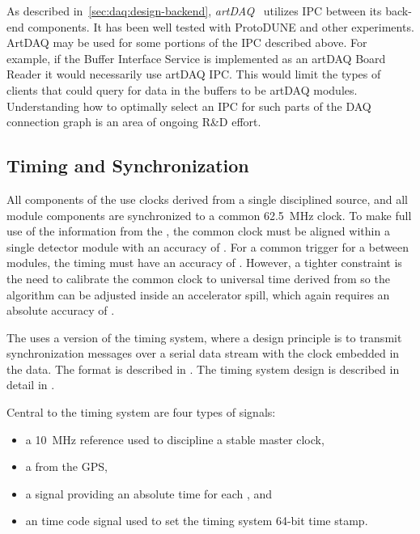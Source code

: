 As described in~\ref{sec:daq:design-backend}, \textit{artDAQ}~\cite{artdaq}
utilizes IPC between its back-end components. 
It has been well tested with ProtoDUNE and other experiments. 
ArtDAQ may be used for some portions of the IPC described above. 
For example, if the Buffer Interface Service is implemented as an artDAQ Board
Reader it would necessarily use artDAQ IPC. 
This would limit the types of clients that could query for data in the buffers
to be artDAQ modules. 
Understanding how to optimally select an IPC for such parts of the DAQ
connection graph is an area of ongoing R\&D effort.

\subsection{Timing and Synchronization}
\label{sec:daq:design-timing}

All components of the  use clocks derived from a single 
disciplined source, and all module components are synchronized to a common
\SI{62.5}{MHz} clock. 
To make full use of the information from the , the common clock must
be aligned within a single detector module with an accuracy of
. 
For a common trigger for a  between modules, the timing must have an
accuracy of .
However, a tighter constraint is the need to calibrate the common clock to
universal time derived from  so the  algorithm can be
adjusted inside an accelerator spill, which again requires an absolute accuracy
of .

The   uses a version of the  timing
system, where a design principle is to transmit synchronization messages over a
serial data stream with the clock embedded in the data. The format is described
in . The timing system design is described in detail in
.

Central to the timing system are four types of signals:
\begin{itemize}
\item a \SI{10}{\mega\hertz} reference used to discipline a stable master clock,
\item a  from the GPS,
\item a  signal providing an absolute time for each , and
\item an  time code signal
  used to set the timing system 64-bit time stamp.
\end{itemize}

